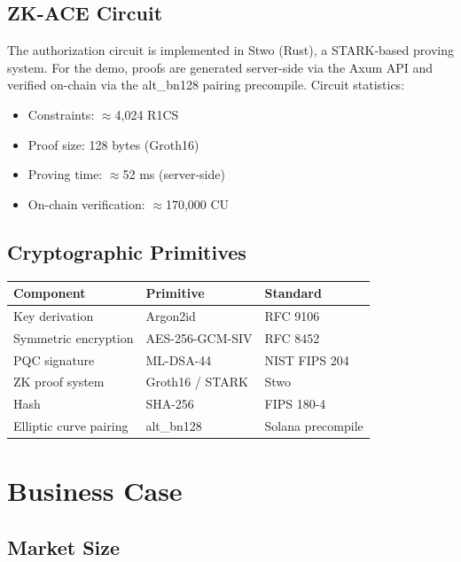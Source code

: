 \documentclass[11pt, a4paper]{article}
\begin{document}
\subsection{ZK-ACE Circuit}

The authorization circuit is implemented in Stwo (Rust), a STARK-based proving system.
For the demo, proofs are generated server-side via the Axum API and verified on-chain
via the alt\_bn128 pairing precompile. Circuit statistics:

\begin{itemize}
  \item Constraints: $\approx$4,024 R1CS
  \item Proof size: 128 bytes (Groth16)
  \item Proving time: $\approx$52 ms (server-side)
  \item On-chain verification: $\approx$170,000 CU
\end{itemize}

\subsection{Cryptographic Primitives}

\begin{center}
\begin{tabular}{lll}
  \toprule
  \textbf{Component} & \textbf{Primitive} & \textbf{Standard} \\
  \midrule
  Key derivation & Argon2id & RFC 9106 \\
  Symmetric encryption & AES-256-GCM-SIV & RFC 8452 \\
  PQC signature & ML-DSA-44 & NIST FIPS 204 \\
  ZK proof system & Groth16 / STARK & Stwo \\
  Hash & SHA-256 & FIPS 180-4 \\
  Elliptic curve pairing & alt\_bn128 & Solana precompile \\
  \bottomrule
\end{tabular}
\end{center}

\section{Business Case}

\subsection{Market Size}
\end{document}
